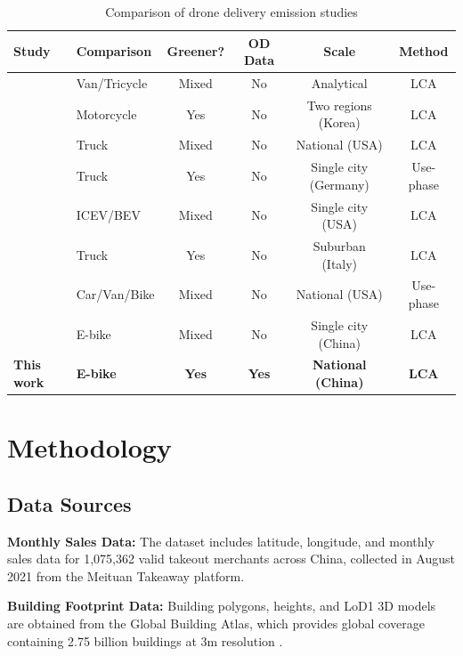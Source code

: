 \documentclass[11pt]{article}
\begin{document}
\begin{table}[h]
  \centering
  \caption{Comparison of drone delivery emission studies}
  \label{tab:lit_review}
  \begin{tabular}{l l c c c c}
    \toprule
    \textbf{Study} & \textbf{Comparison} & \textbf{Greener?} & \textbf{OD Data} & \textbf{Scale} & \textbf{Method} \\
    \midrule
    \textcite{figliozzi_lifecycle_2017} & Van/Tricycle & Mixed & No & Analytical & LCA \\
    \textcite{park_comparative_2018} & Motorcycle & Yes & No & Two regions (Korea) & LCA \\
    \textcite{stolaroff_energy_2018} & Truck & Mixed & No & National (USA) & LCA \\
    \textcite{kirschstein_comparison_2020} & Truck & Yes & No & Single city (Germany) & Use-phase \\
    \textcite{yowtak_comparative_2020} & ICEV/BEV & Mixed & No & Single city (USA) & LCA \\
    \textcite{baldisseri_truck-based_2022} & Truck & Yes & No & Suburban (Italy) & LCA \\
    \textcite{rodrigues_drone_2022} & Car/Van/Bike & Mixed & No & National (USA) & Use-phase \\
    \textcite{li_beyond_2025} & E-bike & Mixed & No & Single city (China) & LCA \\
    \midrule
    \textbf{This work} & \textbf{E-bike} & \textbf{Yes} & \textbf{Yes} & \textbf{National (China)} & \textbf{LCA} \\
    \bottomrule
  \end{tabular}
\end{table}

\section{Methodology}

\subsection{Data Sources}

\textbf{Monthly Sales Data:} The dataset includes latitude, longitude, and monthly sales data for 1,075,362 valid takeout merchants across China, collected in August 2021 from the Meituan Takeaway platform.

\textbf{Building Footprint Data:} Building polygons, heights, and LoD1 3D models are obtained from the Global Building Atlas, which provides global coverage containing 2.75 billion buildings at 3m resolution \parencite{zhu_globalbuildingatlas_2025}.
\end{document}

